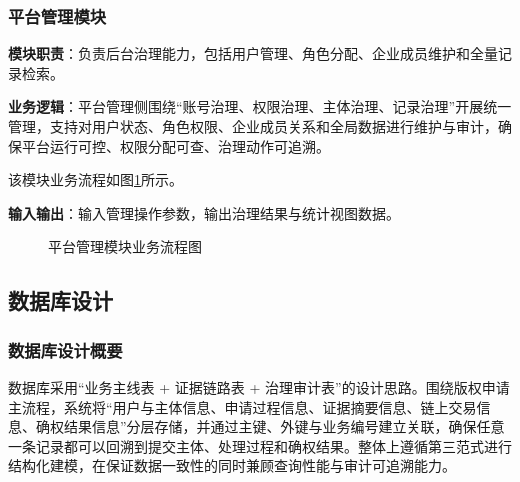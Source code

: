 \documentclass[UTF8,a4paper,12pt]{ctexart}
\begin{document}
\subsubsection{平台管理模块}
\indent\textbf{模块职责}：负责后台治理能力，包括用户管理、角色分配、企业成员维护和全量记录检索。\par

\indent\textbf{业务逻辑}：平台管理侧围绕“账号治理、权限治理、主体治理、记录治理”开展统一管理，支持对用户状态、角色权限、企业成员关系和全局数据进行维护与审计，确保平台运行可控、权限分配可查、治理动作可追溯。\par
\indent 该模块业务流程如图\ref{fig:platform-admin-flow}所示。\par
\textbf{输入输出}：输入管理操作参数，输出治理结果与统计视图数据。

\begin{figure}[H]
  \centering
  \caption{平台管理模块业务流程图}
  \label{fig:platform-admin-flow}
\end{figure}


\subsection{数据库设计}
\subsubsection{数据库设计概要}
\indent 数据库采用“业务主线表 + 证据链路表 + 治理审计表”的设计思路。围绕版权申请主流程，系统将“用户与主体信息、申请过程信息、证据摘要信息、链上交易信息、确权结果信息”分层存储，并通过主键、外键与业务编号建立关联，确保任意一条记录都可以回溯到提交主体、处理过程和确权结果。整体上遵循第三范式进行结构化建模，在保证数据一致性的同时兼顾查询性能与审计可追溯能力。
\end{document}
